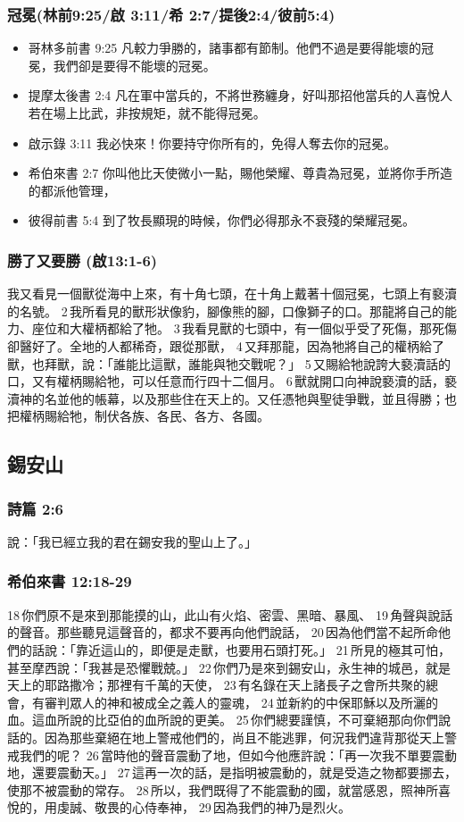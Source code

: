 \subsubsection{冠冕(林前9:25/啟 3:11/希 2:7/提後2:4/彼前5:4)}
\begin{itemize}
\itemsep-.25em
\item 哥林多前書 9:25 凡較力爭勝的，諸事都有節制。他們不過是要得能壞的冠冕，我們卻是要得不能壞的冠冕。
\item 提摩太後書 2:4 凡在軍中當兵的，不將世務纏身，好叫那招他當兵的人喜悅人若在場上比武，非按規矩，就不能得冠冕。
\item 啟示錄 3:11 我必快來！你要持守你所有的，免得人奪去你的冠冕。
\item 希伯來書 2:7 你叫他比天使微小一點，賜他榮耀、尊貴為冠冕，並將你手所造的都派他管理，
\item 彼得前書 5:4 到了牧長顯現的時候，你們必得那永不衰殘的榮耀冠冕。
\end{itemize}

\subsubsection{勝了又要勝 (啟13:1-6)}
我又看見一個獸從海中上來，有十角七頭，在十角上戴著十個冠冕，七頭上有褻瀆的名號。 2 我所看見的獸形狀像豹，腳像熊的腳，口像獅子的口。那龍將自己的能力、座位和大權柄都給了牠。 3 我看見獸的七頭中，有一個似乎受了死傷，那死傷卻醫好了。全地的人都稀奇，跟從那獸， 4 又拜那龍，因為牠將自己的權柄給了獸，也拜獸，說：「誰能比這獸，誰能與牠交戰呢？」 5 又賜給牠說誇大褻瀆話的口，又有權柄賜給牠，可以任意而行四十二個月。 6 獸就開口向神說褻瀆的話，褻瀆神的名並他的帳幕，以及那些住在天上的。又任憑牠與聖徒爭戰，並且得勝；也把權柄賜給牠，制伏各族、各民、各方、各國。


\subsection{錫安山}


\subsubsection{詩篇 2:6}
說：「我已經立我的君在錫安我的聖山上了。」
\subsubsection{希伯來書 12:18-29}
18 你們原不是來到那能摸的山，此山有火焰、密雲、黑暗、暴風、 19 角聲與說話的聲音。那些聽見這聲音的，都求不要再向他們說話， 20 因為他們當不起所命他們的話說：「靠近這山的，即便是走獸，也要用石頭打死。」 21 所見的極其可怕，甚至摩西說：「我甚是恐懼戰兢。」 22 你們乃是來到錫安山，永生神的城邑，就是天上的耶路撒冷；那裡有千萬的天使， 23 有名錄在天上諸長子之會所共聚的總會，有審判眾人的神和被成全之義人的靈魂， 24 並新約的中保耶穌以及所灑的血。這血所說的比亞伯的血所說的更美。 25 你們總要謹慎，不可棄絕那向你們說話的。因為那些棄絕在地上警戒他們的，尚且不能逃罪，何況我們違背那從天上警戒我們的呢？ 26 當時他的聲音震動了地，但如今他應許說：「再一次我不單要震動地，還要震動天。」 27 這再一次的話，是指明被震動的，就是受造之物都要挪去，使那不被震動的常存。 28 所以，我們既得了不能震動的國，就當感恩，照神所喜悅的，用虔誠、敬畏的心侍奉神， 29 因為我們的神乃是烈火。

